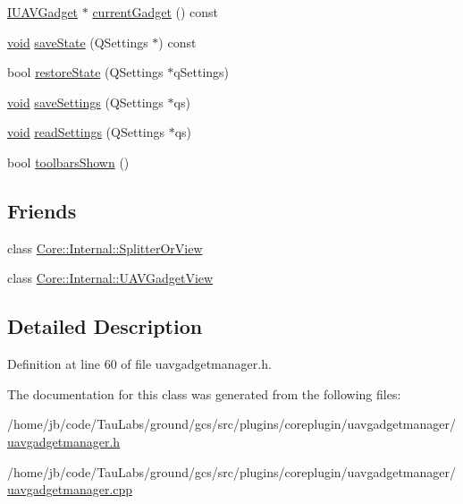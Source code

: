 \begin{DoxyCompactItemize}
\item 
\hyperlink{class_core_1_1_i_u_a_v_gadget}{\-I\-U\-A\-V\-Gadget} $\ast$ \hyperlink{group___core_plugin_gae3f5fe2cc834973db82aa3df3400b297}{current\-Gadget} () const 
\item 
\hyperlink{group___u_a_v_objects_plugin_ga444cf2ff3f0ecbe028adce838d373f5c}{void} \hyperlink{group___core_plugin_ga3ac2a36a18132cd5997fc77934910eb4}{save\-State} (\-Q\-Settings $\ast$) const 
\item 
bool \hyperlink{group___core_plugin_gae6d15e0e2e171db06945917f6f330488}{restore\-State} (\-Q\-Settings $\ast$q\-Settings)
\item 
\hyperlink{group___u_a_v_objects_plugin_ga444cf2ff3f0ecbe028adce838d373f5c}{void} \hyperlink{group___core_plugin_gae098f8fd57c1689becd25fe77165ba58}{save\-Settings} (\-Q\-Settings $\ast$qs)
\item 
\hyperlink{group___u_a_v_objects_plugin_ga444cf2ff3f0ecbe028adce838d373f5c}{void} \hyperlink{group___core_plugin_gadd58657a986d6952a7916697c6d776bf}{read\-Settings} (\-Q\-Settings $\ast$qs)
\item 
bool \hyperlink{group___core_plugin_gac0cf41fa8cd010a9d8df7de3a54a7987}{toolbars\-Shown} ()
\end{DoxyCompactItemize}
\subsection*{\-Friends}
\begin{DoxyCompactItemize}
\item 
class \hyperlink{group___core_plugin_ga60e1336d12b6e13453f7f00503a94d6c}{\-Core\-::\-Internal\-::\-Splitter\-Or\-View}
\item 
class \hyperlink{group___core_plugin_ga30a55036c55042e1e256be357df9b612}{\-Core\-::\-Internal\-::\-U\-A\-V\-Gadget\-View}
\end{DoxyCompactItemize}


\subsection{\-Detailed \-Description}


\-Definition at line 60 of file uavgadgetmanager.\-h.



\-The documentation for this class was generated from the following files\-:\begin{DoxyCompactItemize}
\item 
/home/jb/code/\-Tau\-Labs/ground/gcs/src/plugins/coreplugin/uavgadgetmanager/\hyperlink{uavgadgetmanager_8h}{uavgadgetmanager.\-h}\item 
/home/jb/code/\-Tau\-Labs/ground/gcs/src/plugins/coreplugin/uavgadgetmanager/\hyperlink{uavgadgetmanager_8cpp}{uavgadgetmanager.\-cpp}\end{DoxyCompactItemize}
